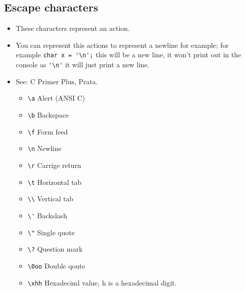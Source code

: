 \subsection{Escape characters}
\begin{itemize}
    \item These characters represent an action.
    \item You can represent this actions to represent a newline for example; for example \verb|char x = '\n';| this will be a new line, it won't print out in the console as \verb|'\n'| it will just print a new line.
    \item See: C Primer Plus, Prata.
        \begin{itemize}
            \item \verb|\a| Alert (ANSI C)
            \item \verb|\b| Backspace
            \item \verb|\f| Form feed
            \item \verb|\n| Newline 
            \item \verb|\r| Carrige return 
            \item \verb|\t| Horizontal tab
            \item \verb|\\| Vertical tab 
            \item \verb|\'| Backslash 
            \item \verb|\"| Single quote
            \item \verb|\?| Question mark
            \item \verb|\0oo| Double qoute 
            \item \verb|\xhh| Hexadeciml value, h is a hexadecimal digit.
        \end{itemize}
\end{itemize}
